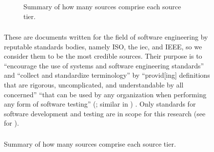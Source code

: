 \ifnotpaper\begin{figure}[t!]\else\begin{figure}[b!]\fi
    \centering
    \caption{Summary of how many sources comprise each source tier.}
    \label{fig:sourceSummary}
\end{figure}

\ifnotpaper\newpage\fi
\subsubsection{}\label{stds}

These are documents written for the field of software engineering by reputable
standards bodies, namely ISO, the \acf{iec}, and IEEE, so we consider them to
be the most credible sources. Their purpose is to
``encourage the use of systems and software engineering standards'' and
``collect and standardize terminology'' by ``provid[ing] definitions that are
rigorous, uncomplicated, and understandable by all concerned''
\citep[p.~viii]{IEEE2017} ``that can be used by any organization when
performing any form of software testing'' \ifnotpaper
    (\citeyear[p.~vii]{IEEE2022}; similar in \citeyear[p.~ix]{IEEE2016})\else
    \cite[p.~vii]{IEEE2022}\fi.
Only standards for software development and testing are in scope for
this research (see  for \highLvlScope).

\subsubsection{}\label{metas}


\end{figure}
